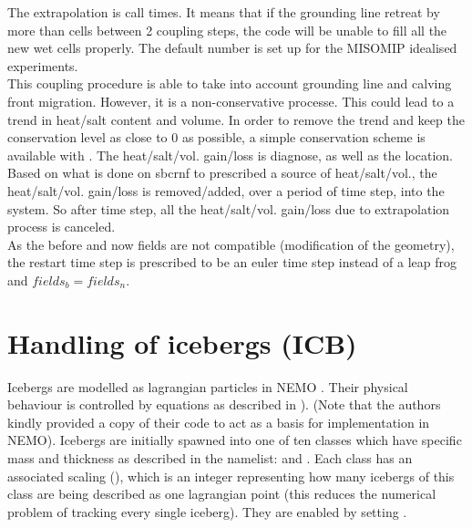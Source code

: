 \documentclass[../tex_main/NEMO_manual]{subfiles}
\begin{document}
The extrapolation is call  times. It means that if the grounding line retreat by more than  cells between 2 coupling steps,
 the code will be unable to fill all the new wet cells properly. The default number is set up for the MISOMIP idealised experiments.\\
This coupling procedure is able to take into account grounding line and calving front migration. However, it is a non-conservative processe. 
This could lead to a trend in heat/salt content and volume. In order to remove the trend and keep the conservation level as close to 0 as possible,
 a simple conservation scheme is available with . The heat/salt/vol. gain/loss is diagnose, as well as the location. 
Based on what is done on sbcrnf to prescribed a source of heat/salt/vol., the heat/salt/vol. gain/loss is removed/added,
 over a period of  time step, into the system. 
So after  time step, all the heat/salt/vol. gain/loss due to extrapolation process is canceled.\\

As the before and now fields are not compatible (modification of the geometry), the restart time step is prescribed to be an euler time step instead of a leap frog and $fields_b = fields_n$.
%
\section{Handling of icebergs (ICB)}
\label{sec:ICB_icebergs}

Icebergs are modelled as lagrangian particles in NEMO \citep{Marsh_GMD2015}.
Their physical behaviour is controlled by equations as described in \citet{Martin_Adcroft_OM10} ).
(Note that the authors kindly provided a copy of their code to act as a basis for implementation in NEMO).
Icebergs are initially spawned into one of ten classes which have specific mass and thickness as described 
in the  namelist: 
 and .
Each class has an associated scaling (), which is an integer representing how many icebergs 
of this class are being described as one lagrangian point (this reduces the numerical problem of tracking every single iceberg).
They are enabled by setting .
\end{document}
